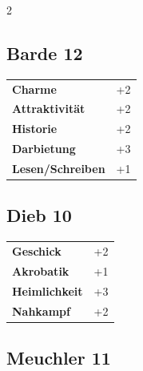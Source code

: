 \begin{multicols}{2}
\begin{tcolorbox}
    \subsection*{Barde \hfill \small{12 }}
    \tcblower




\begin{tabular}{@{}ll@{}}
    \textbf{Charme} & +2\\
    \textbf{Attraktivität} & +2\\
    \textbf{Historie} & +2\\
    \textbf{Darbietung} & +3\\
    \textbf{Lesen/Schreiben} & +1\\
\end{tabular}


\end{tcolorbox}

\begin{tcolorbox}
    \subsection*{Dieb \hfill \small{10 }}
    \tcblower




\begin{tabular}{@{}ll@{}}
    \textbf{Geschick} & +2\\
    \textbf{Akrobatik} & +1\\
    \textbf{Heimlichkeit} & +3\\
    \textbf{Nahkampf} & +2\\
\end{tabular}


\end{tcolorbox}

\begin{tcolorbox}
    \subsection*{Meuchler \hfill \small{11 }}
    \tcblower





\end{tcolorbox}
\end{multicols}
